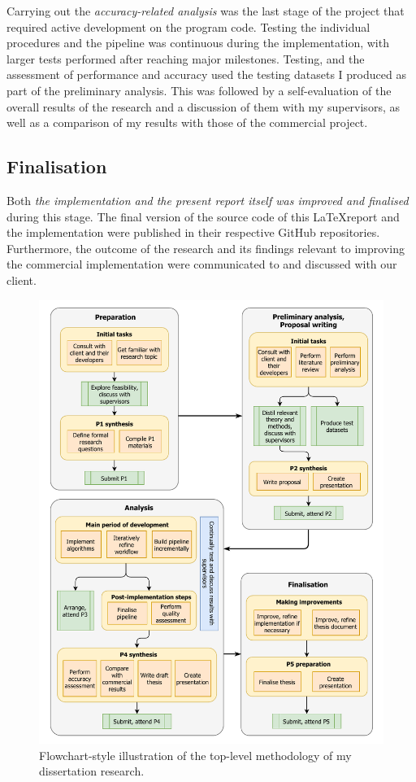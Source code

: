 Carrying out the \textit{accuracy-related analysis} was the last stage of the project that required active development on the program code. Testing the individual procedures and the pipeline was continuous during the implementation, with larger tests performed after reaching major milestones. Testing, and the assessment of performance and accuracy used the testing datasets I produced as part of the preliminary analysis. This was followed by a self-evaluation of the overall results of the research and a discussion of them with my supervisors, as well as a comparison of my results with those of the commercial project.

\subsection{Finalisation}
\label{sub:finalisation}

Both \textit{the implementation and the present report itself was improved and finalised} during this stage. The final version of the source code of this \LaTeX report and the implementation were published in their respective GitHub repositories. Furthermore, the outcome of the research and its findings relevant to improving the commercial implementation were communicated to and discussed with our client.

\begin{figure}
    \centering
    \includegraphics[width=\linewidth]{final_report/figs/methodology.pdf}
    \caption{Flowchart-style illustration of the top-level methodology of my dissertation research.}
    \label{fig:methodologyflow}
\end{figure}


